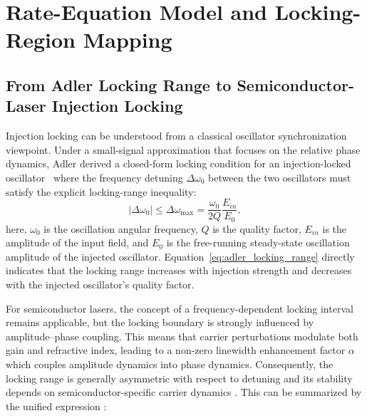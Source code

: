 \documentclass[%
 aip,
 apl,
 amsmath,amssymb,
 reprint,%
 floatfix,
]{revtex4-1}
\begin{document}
\section{Rate-Equation Model and Locking-Region Mapping}

\subsection{From Adler Locking Range to Semiconductor-Laser Injection Locking}

Injection locking can be understood from a classical oscillator synchronization viewpoint. Under a small-signal approximation that focuses on the relative phase dynamics, Adler derived a closed-form locking condition for an injection-locked oscillator~\cite{Adler1946ProcIRE_Locking} where the frequency detuning $\Delta\omega_0$ between the two oscillators must satisfy the explicit locking-range inequality:
\begin{equation}
\left|\Delta\omega_0\right|
\le \Delta\omega_{\max}
= \frac{\omega_0}{2Q}\frac{E_{in}}{E_0},
\label{eq:adler_locking_range}
\end{equation}
here, $\omega_0$ is the oscillation angular frequency, $Q$ is the quality factor, $E_{in}$ is the amplitude of the input field, and $E_0$ is the free-running steady-state oscillation amplitude of the injected oscillator. Equation~\eqref{eq:adler_locking_range} directly indicates that the locking range increases with injection strength and decreases with the injected oscillator's quality factor.

For semiconductor lasers, the concept of a frequency-dependent locking interval remains applicable, but the locking boundary is strongly influenced by amplitude--phase coupling. This means that carrier perturbations modulate both gain and refractive index, leading to a non-zero linewidth enhancement factor $\alpha$ which couples amplitude dynamics into phase dynamics. Consequently, the locking range is generally asymmetric with respect to detuning and its stability depends on semiconductor-specific carrier dynamics \cite{Lang1982InjectionLockingProperties,HenryOlssonDutta1985LockingRangeStability,Mogensen1985JQE_LockingStability_SemiconductorInjection}. This can be summarized by the unified expression \cite{LiuSlavik2020OILTutorial}:
\end{document}
